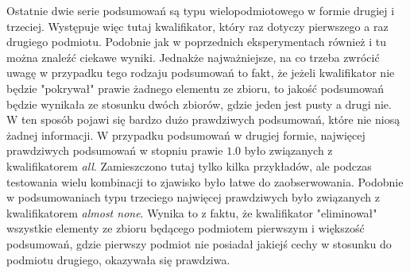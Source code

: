\documentclass{classrep}
\begin{document}
{        Ostatnie dwie serie podsumowań są typu wielopodmiotowego w formie drugiej i trzeciej.
        Występuje więc tutaj kwalifikator, który raz dotyczy pierwszego a raz drugiego podmiotu.
        Podobnie jak w poprzednich eksperymentach również i tu można znaleźć ciekawe wyniki.
        Jednakże najważniejsze, na co trzeba zwrócić uwagę w przypadku tego rodzaju podsumowań to
        fakt, że jeżeli kwalifikator nie będzie "pokrywał" prawie żadnego elementu ze zbioru, to
        jakość podsumowań będzie wynikała ze stosunku dwóch zbiorów, gdzie jeden jest pusty a drugi
        nie. W ten sposób pojawi się bardzo dużo prawdziwych podsumowań, które nie niosą żadnej
        informacji. W przypadku podsumowań w drugiej formie, najwięcej prawdziwych podsumowań w
        stopniu prawie $1.0$ było związanych z kwalifikatorem \emph{all}. Zamieszczono tutaj tylko
        kilka przykładów, ale podczas testowania wielu kombinacji to zjawisko było łatwe do
        zaobserwowania. Podobnie w podsumowaniach typu trzeciego najwięcej prawdziwych było
        związanych z kwalifikatorem \emph{almost none}. Wynika to z faktu, że kwalifikator
        "eliminował" wszystkie elementy ze zbioru będącego podmiotem pierwszym i większość
        podsumowań, gdzie pierwszy podmiot nie posiadał jakiejś cechy w stosunku do podmiotu
        drugiego, okazywała się prawdziwa.
    }
\end{document}
